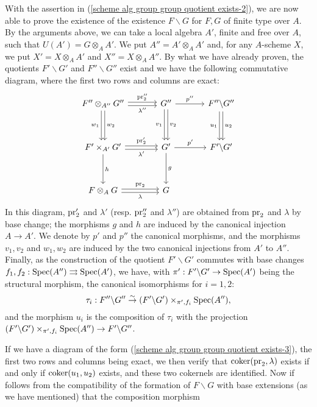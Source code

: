 With the assertion in (\ref{scheme alg group group quotient exists-2}), we are now able to prove the existence of the existence $F\backslash G$ for $F,G$ of finite type over $A$. By the arguments above, we can take a local algebra $A'$, finite and free over $A$, such that $U(A')=G\otimes_AA'$. We put $A''=A'\otimes_AA'$ and, for any $A$-scheme $X$, we put $X'=X\otimes_AA'$ and $X''=X\otimes_AA''$. By what we have already proven, the quotients $F'\backslash G'$ and $F''\backslash G''$ exist and we have the following commutative diagram, where the first two rows and columns are exact:
\begin{equation}\label{scheme alg group group quotient exists-3}
\begin{tikzcd}[row sep=12mm, column sep=12mm]
F''\otimes_{A''}G''\ar[r,shift left=2pt,"\pr_2''"]\ar[r,shift right=2pt,swap,"\lambda''"]\ar[d,shift left=2pt,"w_2"]\ar[d,shift right=2pt,swap,"w_1"]&G''\ar[r,"p''"]\ar[d,shift left=2pt,"v_2"]\ar[d,shift right=2pt,swap,"v_1"]&F''\backslash G''\ar[d,shift left=2pt,"u_2"]\ar[d,shift right=2pt,swap,"u_1"]\\
F'\times_{A'}G'\ar[r,shift left=2pt,"\pr_2'"]\ar[r,shift right=2pt,swap,"\lambda'"]\ar[d,"h"]&G'\ar[r,"p'"]\ar[d,"g"]&F'\backslash G'\\
F\otimes_AG\ar[r,shift left=2pt,"\pr_2"]\ar[r,shift right=2pt,swap,"\lambda"]&G
\end{tikzcd}
\end{equation}
In this diagram, $\mathrm{pr}_2'$ and $\lambda'$ (resp. $\mathrm{pr}_2''$ and $\lambda''$) are obtained from $\mathrm{pr}_2$ and $\lambda$ by base change; the morphisms $g$ and $h$ are induced by the canonical injection $A\to A'$. We denote by $p'$ and $p''$ the canonical morphisms, and the morphisms $v_1,v_2$ and $w_1,w_2$ are induced by the two canonical injections from $A'$ to $A''$. Finally, as the construction of the quotient $F'\backslash G'$ commutes with base changes $f_1,f_2:\mathrm{Spec}(A'')\rightrightarrows\mathrm{Spec}(A')$, we have, with $\pi':F'\backslash G'\to\mathrm{Spec}(A')$ being the structural morphism, the canonical isomorphisms for $i=1,2$:
\[\tau_i:F''\backslash G''\stackrel{\sim}{\to} (F'\backslash G')\times_{\pi',f_i}\mathrm{Spec}(A''),\]
and the morphism $u_i$ is the composition of $\tau_i$ with the projection $(F'\backslash G')\times_{\pi',f_i}\mathrm{Spec}(A'')\to F'\backslash G''$.\par
If we have a diagram of the form (\ref{scheme alg group group quotient exists-3}), the first two rows and columns being exact, we then verify that $\operatorname{coker}(\mathrm{pr}_2,\lambda)$ exists if and only if $\operatorname{coker}(u_1,u_2)$ exists, and these two cokernels are identified. Now if follows from the compatibility of the formation of $F\backslash G$ with base extensions (as we have mentioned) that the composition morphism
